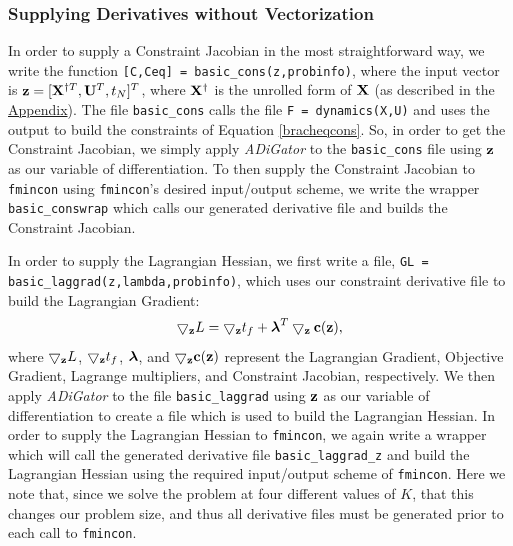 \documentclass[10pt,pdftex]{article}
\begin{document}
\subsubsection*{Supplying Derivatives without Vectorization}
In order to supply a Constraint Jacobian in the most straightforward way, we write the function \texttt{[C,Ceq] = basic\_cons(z,probinfo)}, where the input vector is $\mathbf{z} = [\mathbf{X}^{\dag T}, \mathbf{U}^T,t_N]^T$, where $\mathbf{X}^{\dag}$ is the unrolled form of $\mathbf{X}$ (as described in the \hyperlink{Appendix}{Appendix}). The file \texttt{basic\_cons} calls the file \texttt{F = dynamics(X,U)} and uses the output to build the constraints of Equation \ref{bracheqcons}. So, in order to get the Constraint Jacobian, we simply apply \emph{ADiGator} to the \texttt{basic\_cons} file using $\mathbf{z}$ as our variable of differentiation. To then supply the Constraint Jacobian to \texttt{fmincon} using \texttt{fmincon}'s desired input/output scheme, we write the wrapper \texttt{basic\_conswrap} which calls our generated derivative file and builds the Constraint Jacobian.

In order to supply the Lagrangian Hessian, we first write a file, \texttt{GL = basic\_laggrad(z,lambda,probinfo)}, which uses our constraint derivative file to build the Lagrangian Gradient:
\begin{equation}
\bigtriangledown_{\mathbf{z}}L = \bigtriangledown_{\mathbf{z}} t_f + \boldsymbol{\lambda}^T \bigtriangledown_{\mathbf{z}}\mathbf{c}(\mathbf{z}),
\end{equation}
where $\bigtriangledown_{\mathbf{z}}L$, $\bigtriangledown_{\mathbf{z}} t_f$, $\boldsymbol{\lambda}$, and $\bigtriangledown_{\mathbf{z}}\mathbf{c}(\mathbf{z})$ represent the Lagrangian Gradient, Objective Gradient, Lagrange multipliers, and Constraint Jacobian, respectively. We then apply \emph{ADiGator} to the file \texttt{basic\_laggrad} using $\mathbf{z}$ as our variable of differentiation to create a file which is used to build the Lagrangian Hessian. In order to supply the Lagrangian Hessian to \texttt{fmincon}, we again write a wrapper which will call the generated derivative file \texttt{basic\_laggrad\_z} and build the Lagrangian Hessian using the required input/output scheme of \texttt{fmincon}. Here we note that, since we solve the problem at four different values of $K$, that this changes our problem size, and thus all derivative files must be generated prior to each call to \texttt{fmincon}.
\end{document}
